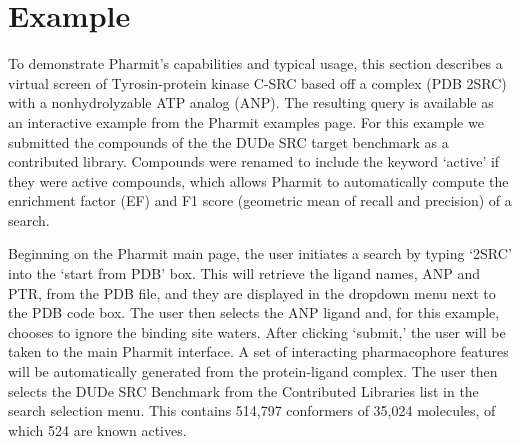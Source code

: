 \section{Example}

To demonstrate Pharmit's capabilities and typical usage, this section describes a virtual screen of Tyrosin-protein kinase C-SRC based off a complex (PDB 2SRC) with a nonhydrolyzable ATP analog (ANP). The resulting query is available as an interactive example from the Pharmit examples page.  For this example we submitted the compounds of the the DUDe \cite{Mysinger_2012} SRC target benchmark as a contributed library.  Compounds were renamed to include the keyword `active' if they were active compounds, which allows Pharmit to automatically compute the enrichment factor (EF) and F1 score (geometric mean of recall and precision) of a search.

  Beginning on the Pharmit main page, the user initiates a search by typing `2SRC' into the `start from PDB' box. This will retrieve the ligand names, ANP and PTR, from the PDB file, and they are displayed in the dropdown menu next to the PDB code box. The user then selects the ANP ligand and, for this example, chooses to ignore the binding site waters. After clicking `submit,' the user will be taken to the main Pharmit interface. A set of interacting pharmacophore features will be automatically generated from the protein-ligand complex.  The user then selects the DUDe SRC Benchmark from the Contributed Libraries list in the search selection menu.  This contains 514,797 conformers of 35,024 molecules, of which 524 are known actives.
  
